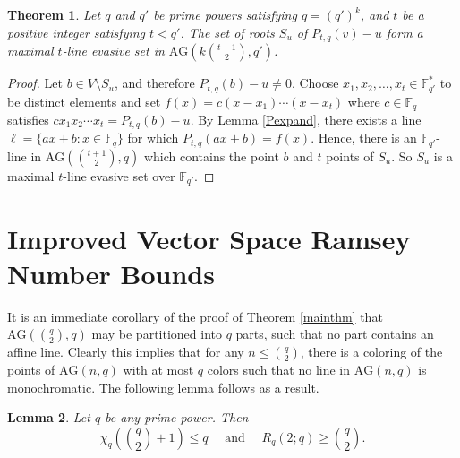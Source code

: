 \documentclass[12pt]{article}
\newtheorem{thm}{Theorem}[section]
\newtheorem{lem}[thm]{Lemma}
\newcommand{\F}{\mathbb{F}}
\newcommand{\AG}{\text{AG}}
\newcommand{\hs}{\hspace{1em}}
\begin{document}
\begin{thm}\label{maxii}
    Let $q$ and $q'$ be prime powers satisfying $q = (q')^k$, and $t$ be a positive integer satisfying $t < q'$. The set of roots $S_u$ of $P_{t, q}(v)-u$ form a maximal $t$-line evasive set in $\AG(k\binom{t+1}{2}, q')$.
\end{thm}

\begin{proof}
Let $b \in V\setminus S_u$, and therefore $P_{t, q}(b) - u \neq 0$. Choose $x_1, x_2, \dots, x_t \in \F_{q'}^*$ to be distinct elements and set $f(x) = c(x-x_1)\cdots(x - x_t)$ where $c \in \F_q$ satisfies $cx_1x_2\cdots x_t = P_{t, q}(b) - u$. By Lemma \ref{Pexpand}, there exists a line $\ell = \{ ax + b : x \in \F_q\}$ for which $P_{t, q}(ax + b) = f(x)$. Hence, there is an $\F_{q'}$-line in $\AG(\binom{t+1}{2}, q)$ which contains the point $b$ and $t$ points of $S_u$. So $S_u$ is a maximal $t$-line evasive set over $\F_{q'}$.
\end{proof}



\section{Improved Vector Space Ramsey Number Bounds}

It is an immediate corollary of the proof of Theorem \ref{mainthm} that $\AG(\binom{q}{2}, q)$ may be partitioned into $q$ parts, such that no part contains an affine line. Clearly this implies that for any $n \leq \binom{q}{2}$, there is a coloring of the points of $\AG(n, q)$ with at most $q$ colors such that no line in $\AG(n,q)$ is monochromatic.  The following lemma follows as a result.

\begin{lem}\label{lem:chromatic}
    Let $q$ be any prime power. Then 
    $$
    \chi_q\left(\binom{q}{2} + 1\right) \leq q \hs \text{ and } \hs R_q(2;q) \geq  \binom{q}{2} .
    $$
\end{lem}
\end{document}
